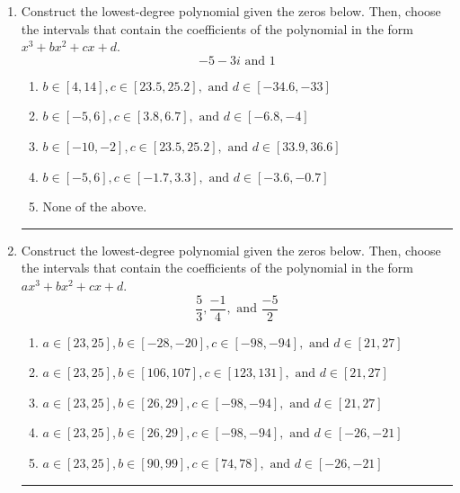 \documentclass[14pt]{extbook}
\newcommand{\litem}[1]{\item#1\hspace*{-1cm}\rule{\textwidth}{0.4pt}}
\begin{document}
\begin{enumerate}
{\begin{enumerate}[label=\Alph*.]
\end{enumerate} }
\litem{
Construct the lowest-degree polynomial given the zeros below. Then, choose the intervals that contain the coefficients of the polynomial in the form $x^3+bx^2+cx+d$.\[ -5 - 3 i \text{ and } 1 \]\begin{enumerate}[label=\Alph*.]
\item \( b \in [4, 14], c \in [23.5, 25.2], \text{ and } d \in [-34.6, -33] \)
\item \( b \in [-5, 6], c \in [3.8, 6.7], \text{ and } d \in [-6.8, -4] \)
\item \( b \in [-10, -2], c \in [23.5, 25.2], \text{ and } d \in [33.9, 36.6] \)
\item \( b \in [-5, 6], c \in [-1.7, 3.3], \text{ and } d \in [-3.6, -0.7] \)
\item \( \text{None of the above.} \)

\end{enumerate} }
\litem{
Construct the lowest-degree polynomial given the zeros below. Then, choose the intervals that contain the coefficients of the polynomial in the form $ax^3+bx^2+cx+d$.\[ \frac{5}{3}, \frac{-1}{4}, \text{ and } \frac{-5}{2} \]\begin{enumerate}[label=\Alph*.]
\item \( a \in [23, 25], b \in [-28, -20], c \in [-98, -94], \text{ and } d \in [21, 27] \)
\item \( a \in [23, 25], b \in [106, 107], c \in [123, 131], \text{ and } d \in [21, 27] \)
\item \( a \in [23, 25], b \in [26, 29], c \in [-98, -94], \text{ and } d \in [21, 27] \)
\item \( a \in [23, 25], b \in [26, 29], c \in [-98, -94], \text{ and } d \in [-26, -21] \)
\item \( a \in [23, 25], b \in [90, 99], c \in [74, 78], \text{ and } d \in [-26, -21] \)


\end{enumerate}}
\end{enumerate}
\end{document}
